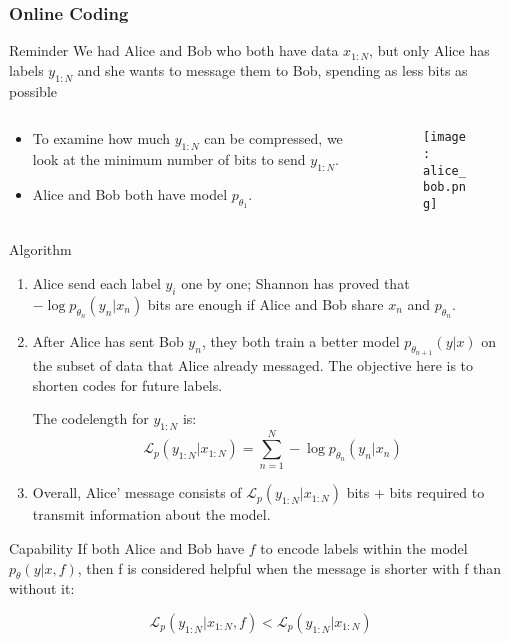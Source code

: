 \documentclass[10pt]{beamer}
\begin{document}
\begin{frame}
	\frametitle{Online Coding}
	\begin{block}{Reminder}
            We had Alice and Bob who both have data $x_{1:N}$, but only Alice has labels $y_{1:N}$ and she wants to message them to Bob, spending as less bits as possible
	\end{block}
\begin{columns}[onlytextwidth]
        \begin{column}{0.3\textwidth}
            \begin{itemize}
                \item To examine how much $y_{1:N}$ can be compressed, we look at the minimum number of bits to send $y_{1:N}$.
                \item Alice and Bob both have model $p_{\theta_1}$.
            \end{itemize}
        \end{column}
        \begin{column}{0.7\textwidth}
            \begin{figure}
                \centering
                \texttt{[image: alice\_bob.png]} 
            \end{figure}
        \end{column}
    \end{columns}
    
\end{frame}

\begin{frame}{Algorithm}
    \begin{enumerate}
        \item Alice send each label $y_i$ one by one; Shannon has proved that $-\log p_{\theta_n}(y_n |x_n)$ bits are enough if Alice and Bob share $x_n$ and $p_{\theta_n}$.
        \item After Alice has sent Bob $y_n$, they both train a better model  $p_{\theta_{n +1}}(y|x)$ on the subset of data that Alice already messaged. The objective here is to shorten codes for future labels.

        The codelength for $y_{1:N}$ is:
        $$\mathcal{L}_p(y_{1:N} |x_{1:N}) = \sum_{n=1}^N -\log p_{\theta_n}(y_n |x_n)$$
        \item Overall, Alice' message consists of $\mathcal{L}_p(y_{1:N} |x_{1:N})$ bits + bits required to transmit information about the model.
    \end{enumerate}

    \begin{block}{Capability}
        If both Alice and Bob have $f$ to encode labels within the model $p_{\theta}(y|x,f)$, then f is considered helpful when the message is shorter with f than without it: 

        $$\mathcal{L}_p(y_{1:N} |x_{1:N},f) < \mathcal{L}_p(y_{1:N} | x_{1:N})$$
    \end{block}
\end{frame}
\end{document}
